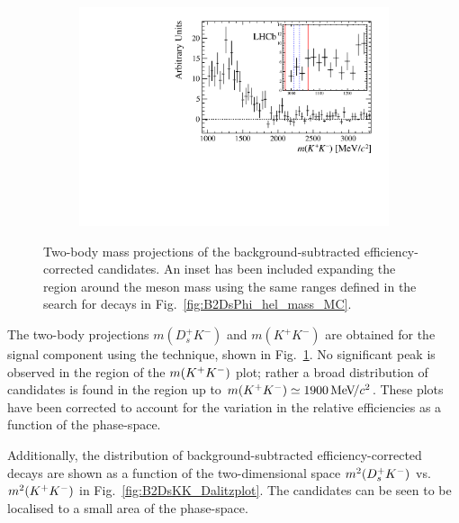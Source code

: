 \begin{figure}[!h]
\begin{subfigure}[t]{0.4\textwidth}
        \includegraphics[width=1.0\textwidth]{figs/B2DsKK/phi_mass_sweighted.pdf}
    \end{subfigure}
    \caption{Two-body mass projections of the background-subtracted efficiency-corrected \decay{\Bp}{\Dsp\Kp\Km} candidates. An inset has been included expanding the region around the \phiz meson mass using the same ranges defined in the search for \decay{\Bp}{\Dsp\phiz} decays in Fig.~\ref{fig:B2DsPhi_hel_mass_MC}.}
    \label{fig:B2DsKK_twobodyprojections}
\end{figure}

The two-body projections $m(D_{s}^{+}K^{-})$ and $m(K^{+}K^{-})$ are obtained for the signal component using the \sPlot technique, shown in Fig.~\ref{fig:B2DsKK_twobodyprojections}. No significant peak is observed in the \phiz region of the $m({{K}^+}{{K}^-})$ plot; rather a broad distribution of candidates is found in the region up to $m({{K}^+}{{K}^-}) \simeq 1900 {\mathrm{\,Me\kern -0.1em V\!/}c^2}$. These plots have been corrected to account for the variation in the relative efficiencies as a function of the phase-space.



Additionally, the distribution of background-subtracted efficiency-corrected \decay{\Bp}{\Dsp\Kp\Km} decays are shown as a function of the two-dimensional space $m^{2}({{D}^+_{s}}{{K}^-})$ vs. $m^{2}({{K}^+}{{K}^-})$ in Fig.~\ref{fig:B2DsKK_Dalitzplot}. The candidates can be seen to be localised to a small area of the phase-space. 

